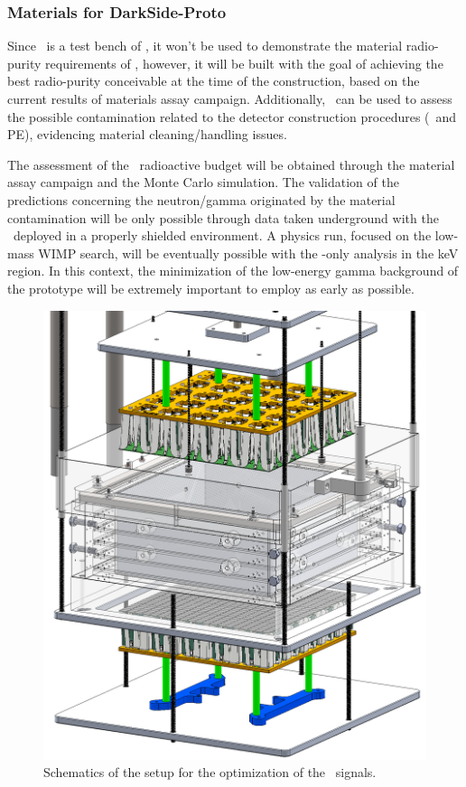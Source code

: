 \subsubsection{Materials for DarkSide-Proto}

Since \DSps\ is a test bench of \DSks, it won't be used to demonstrate the material radio-purity requirements of \DSks, however, it will be built with the goal of achieving the best radio-purity conceivable at the time of the construction, based on the current results of materials assay campaign. Additionally, \DSps\ can be used to assess the possible contamination related to the detector construction procedures (\TPC\ and PE), evidencing material cleaning/handling issues.

The assessment of the \DSps\ radioactive budget will be obtained through the material assay campaign and the Monte Carlo simulation. The validation of the predictions concerning the neutron/gamma originated by the material contamination will be only possible through data taken underground with the \DSps\ deployed in a properly shielded environment. A physics run, focused on the low-mass WIMP search, will be eventually possible with the \STwo-only analysis in the keV region. In this context, the minimization of the low-energy gamma background of the prototype will be extremely important to employ as early as possible.

\begin{figure}[!t]
\centering
\includegraphics[height=0.6\textheight]{./Figures/mini-proto.png}
\caption[Schematics of the setup for the optimization of the \STwo\ signals]{Schematics of the setup for the optimization of the \STwo\ signals.}
\label{fig:mini-proto}
\end{figure}

